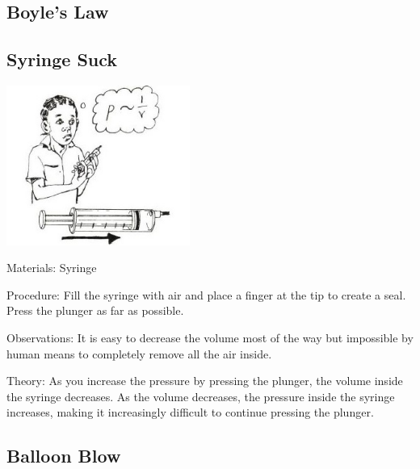 \begin{multicols}{2}
\subsection*{Boyle's Law} 

\subsection{Syringe Suck}

\begin{center}
\includegraphics[width=0.45\textwidth]{./img/source/boyle-syringe.jpg}
\end{center}

\begin{description*}
\item[Materials:]{Syringe}
\item[Procedure:]{Fill the syringe with air and place a finger at the tip to create a seal. Press the plunger as far as possible.}
\item[Observations:]{It is easy to decrease the volume most of the way but impossible by human means to completely remove all the air inside.}
\item[Theory:]{As you increase the pressure by pressing the plunger, the volume inside the syringe decreases. As the volume decreases, the pressure inside the syringe increases, making it increasingly difficult to continue pressing the plunger.}
\end{description*}

\vfill
\columnbreak

\subsection{Balloon Blow}


\end{multicols}
